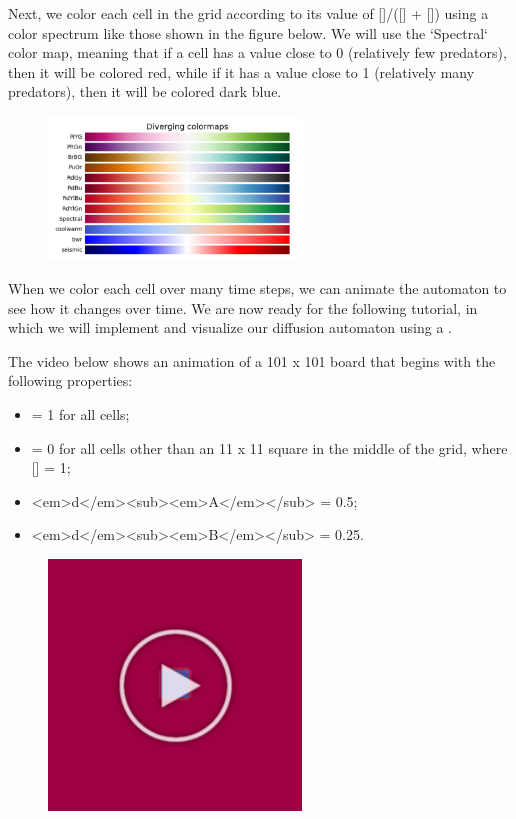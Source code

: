 {{Next, we color each cell in the grid according to its value of []/([] + []) using a color spectrum like those shown in the figure below. We will use the `Spectral` color map, meaning that if a cell has a value close to 0 (relatively few predators), then it will be colored red, while if it has a value close to 1 (relatively many predators), then it will be colored dark blue.

\begin{figure}[h]
\centering
\mySfFamily
\includegraphics[width = 0.6\textwidth]{../images/matplotlib_colormap.png}
\caption{}
\label{fig:matplotlib_colormap}
\end{figure}

When we color each cell over many time steps, we can animate the automaton to see how it changes over time. We are now ready for the following tutorial, in which we will implement and visualize our diffusion automaton using a .


The video below shows an animation of a 101 x 101 board that begins with the following properties:
\begin{itemize}
\item [\textvar{A}] = 1 for all cells;
\item [\textvar{B}] = 0 for all cells other than an 11 x 11 square in the middle of the grid, where [] = 1;
\item <em>d</em><sub><em>A</em></sub> = 0.5;
\item <em>d</em><sub><em>B</em></sub> = 0.25.
\end{itemize}

\begin{figure}[h]
\centering
\mySfFamily
\includegraphics[width = 0.6\textwidth]{../images/diffusion_movie_first_frame.png}
\caption{}
\label{fig:diffusion_movie_first_frame}
\end{figure}

}}
